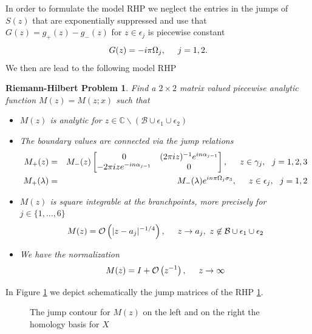 \documentclass[10pt,oneside,reqno]{amsart}
\numberwithin{equation}{section}
\newtheorem{problem}[theorem]{Riemann-Hilbert Problem}
\begin{document}
In order to formulate the model RHP we neglect the entries in the jumps of $S(z)$ that are exponentially suppressed and 
use that $G(z)=g_+(z) - g_-(z)$ for $z\in \epsilon_j$ is piecewise constant 
\begin{equation*}
  G(z) = -i\pi\Omega_j,\hspace{0.5cm} j=1,2.
\end{equation*}
We then are lead to the following model RHP
\begin{problem}
\label{RHPM}
Find a $2\times 2$ matrix valued piecewise analytic function $M(z)=M(z;x)$ such that
\begin{itemize}
 \item $M(z)$ is analytic for $z\in\mathbb{C}\backslash(\mathcal{B}\cup \epsilon_1\cup \epsilon_2)$
  \item The boundary values are connected via the jump relations
\begin{eqnarray*}
  M_+(z)&=&M_-(z)\begin{bmatrix}
                              0 & (2\pi iz)^{-1}e^{in\alpha_{j-1}}\\
-2\pi iz e^{-in\alpha_{j-1}}& 0\\
                             \end{bmatrix},\hspace{0.5cm}z\in\gamma_j,\ \ j=1,2,3\\
M_+(\lambda)&=&M_-(\lambda)e^{i n \pi \Omega_j\sigma_3},\hspace{0.5cm}z\in \epsilon_j,\ \ j=1,2
\end{eqnarray*}
  \item $M(z)$ is square integrable at the branchpoints, more precisely for $j\in\{1,\ldots,6\}$
\begin{equation*}
  M(z) = \mathcal O\left(|z-a_j|^{-1/4}\right),\hspace{0.5cm}z\rightarrow a_j,\ z\not\in\mathcal{B}\cup \epsilon_1\cup \epsilon_2
\end{equation*}
  \item We have the normalization
\begin{equation*}
  M(z) = I+\mathcal O\left(z^{-1}\right),\hspace{0.5cm}z\rightarrow\infty
\end{equation*}
\end{itemize}
\end{problem}
In Figure \ref{modRHP1} we depict schematically the jump matrices of the RHP \ref{RHPM}.
\begin{figure}[tbh]
\begin{center}
\resizebox{1\textwidth}{!}{}
\caption{The jump contour for $M(z)$ on the left and on the right the homology basis for $X$}
\label{modRHP1}
\end{center}
\end{figure}
\end{document}
